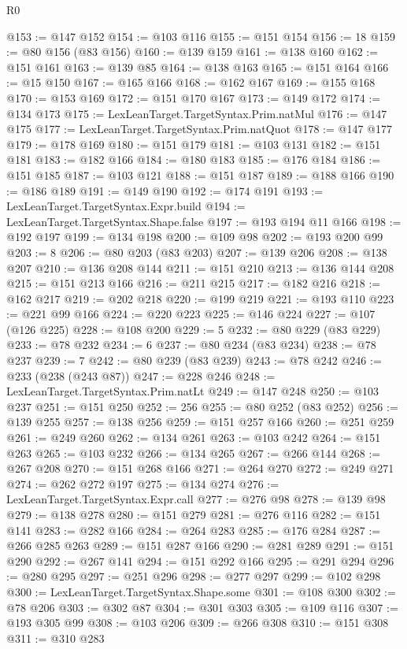 \begin{lexlean}{R0}
\begin{coremodule}
@153 := @147 @152
@154 := @103 @116
@155 := @151 @154
@156 := 18
@159 := @80 @156 (@83 @156)
@160 := @139 @159
@161 := @138 @160
@162 := @151 @161
@163 := @139 @85
@164 := @138 @163
@165 := @151 @164
@166 := @15 @150
@167 := @165 @166
@168 := @162 @167
@169 := @155 @168
@170 := @153 @169
@172 := @151 @170 @167
@173 := @149 @172
@174 := @134 @173
@175 := LexLeanTarget.TargetSyntax.Prim.natMul
@176 := @147 @175
@177 := LexLeanTarget.TargetSyntax.Prim.natQuot
@178 := @147 @177
@179 := @178 @169
@180 := @151 @179
@181 := @103 @131
@182 := @151 @181
@183 := @182 @166
@184 := @180 @183
@185 := @176 @184
@186 := @151 @185
@187 := @103 @121
@188 := @151 @187
@189 := @188 @166
@190 := @186 @189
@191 := @149 @190
@192 := @174 @191
@193 := LexLeanTarget.TargetSyntax.Expr.build
@194 := LexLeanTarget.TargetSyntax.Shape.false
@197 := @193 @194 @11 @166
@198 := @192 @197
@199 := @134 @198
@200 := @109 @98
@202 := @193 @200 @99
@203 := 8
@206 := @80 @203 (@83 @203)
@207 := @139 @206
@208 := @138 @207
@210 := @136 @208 @144
@211 := @151 @210
@213 := @136 @144 @208
@215 := @151 @213 @166
@216 := @211 @215
@217 := @182 @216
@218 := @162 @217
@219 := @202 @218
@220 := @199 @219
@221 := @193 @110
@223 := @221 @99 @166
@224 := @220 @223
@225 := @146 @224
@227 := @107 (@126 @225)
@228 := @108 @200
@229 := 5
@232 := @80 @229 (@83 @229)
@233 := @78 @232
@234 := 6
@237 := @80 @234 (@83 @234)
@238 := @78 @237
@239 := 7
@242 := @80 @239 (@83 @239)
@243 := @78 @242
@246 := @233 (@238 (@243 @87))
@247 := @228 @246
@248 := LexLeanTarget.TargetSyntax.Prim.natLt
@249 := @147 @248
@250 := @103 @237
@251 := @151 @250
@252 := 256
@255 := @80 @252 (@83 @252)
@256 := @139 @255
@257 := @138 @256
@259 := @151 @257 @166
@260 := @251 @259
@261 := @249 @260
@262 := @134 @261
@263 := @103 @242
@264 := @151 @263
@265 := @103 @232
@266 := @134 @265
@267 := @266 @144
@268 := @267 @208
@270 := @151 @268 @166
@271 := @264 @270
@272 := @249 @271
@274 := @262 @272 @197
@275 := @134 @274
@276 := LexLeanTarget.TargetSyntax.Expr.call
@277 := @276 @98
@278 := @139 @98
@279 := @138 @278
@280 := @151 @279
@281 := @276 @116
@282 := @151 @141
@283 := @282 @166
@284 := @264 @283
@285 := @176 @284
@287 := @266 @285 @263
@289 := @151 @287 @166
@290 := @281 @289
@291 := @151 @290
@292 := @267 @141
@294 := @151 @292 @166
@295 := @291 @294
@296 := @280 @295
@297 := @251 @296
@298 := @277 @297
@299 := @102 @298
@300 := LexLeanTarget.TargetSyntax.Shape.some
@301 := @108 @300
@302 := @78 @206
@303 := @302 @87
@304 := @301 @303
@305 := @109 @116
@307 := @193 @305 @99
@308 := @103 @206
@309 := @266 @308
@310 := @151 @308
@311 := @310 @283

\end{coremodule}
\end{lexlean}
